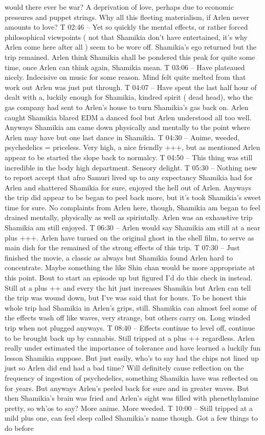 \documentclass[12pt]{book}
\begin{document}
would there ever be war? A deprivation of love, perhaps due to economic pressures and puppet strings. Why all this fleeting materialism, if Arlen never amounts to love? T 02:46 -- Yet so quickly the mental effects, or rather forced philosophical viewpoints ( not that Shamikia don't have entertained, it's why Arlen come here after all ) seem to be wore off. Shamikia's ego returned but the trip remained. Arlen think Shamikia shall be pondered this peak for quite some time, once Arlen can think again, Shamikia mean. T 03:06 -- Have plateaued nicely. Indecisive on music for some reason. Mind felt quite melted from that work out Arlen was just put through. T 04:07 -- Have spent the last half hour of dealt with a, luckily enough for Shamikia, kindred spirit ( dead head), who the gas company had sent to Arlen's house to turn Shamikia's gas back on. Arlen caught Shamikia blared EDM a danced fool but Arlen understood all too well. Anyways Shamikia am came down physically and mentally to the point where Arlen may have but one last dance in Shamikia. T 04:30 -- Anime, weeded, psychedelics = priceless. Very high, a nice friendly +++, but as mentioned Arlen appear to be started the slope back to normalcy. T 04:50 -- This thing was still incredible in the body high department. Sensory delight. T 05:30 -- Nothing new to report accept that afro Samuri lived up to any expectancy Shamikia had for Arlen and shattered Shamikia for sure, enjoyed the hell out of Arlen. Anyways the trip did appear to be began to peel back more, but it's took Shamikia's sweet time for sure. No complaints from Arlen here, though, Shamikia am began to feel drained mentally, physically as well as spiriutally. Arlen was an exhaustive trip Shamikia am still enjoyed. T 06:30 -- Arlen would say Shamikia am still at a near plus +++. Arlen have turned on the original ghost in the shell film, to serve as main dish for the remained of the strong effects of this trip. T 07:30 -- Just finished the movie, a classic as always but Shamikia found Arlen hard to concentrate. Maybe something the like Shin chan would be more appropriate at this point. Bout to start an episode up but figured I'd do this check in instead. Still at a plus ++ and every thc hit just increases Shamikia but Arlen can tell the trip was wound down, but I've was said that for hours. To be honest this whole trip had Shamikia in Arlen's grips, still. Shamikia can almost feel some of the effects wash off like waves, very strange, but others carry on. Long winded trip when not plugged anyways. T 08:40 -- Effects continue to level off, continue to be brought back up by cannabis. Still tripped at a plus ++ regardless. Arlen really under estimated the importance of tolerance and have learned a luckily fun lesson Shamikia suppose. But just easily, who's to say had the chips not lined up just so Arlen did end had a bad time? Will definitely cause reflection on the frequency of ingestion of psychedelics, something Shamikia have was reflected on for years. But anyways Arlen's peeled back for sure and in greater waves. But then Shamikia's brain was fried and Arlen's sight was filled with phenethylamine pretty, so wh'os to say? More anime. More weeded. T 10:00 -- Still tripped at a mild plus one, can feel sleep called Shamikia's name though. Got a few things to do before 
\end{document}
